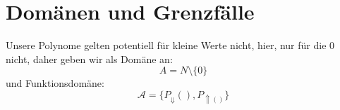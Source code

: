 \documentclass{article}
\begin{document}
	\section{Dom\"anen und Grenzf\"alle}
	Unsere Polynome gelten potentiell f\"ur kleine Werte nicht, hier, nur f\"ur die 0 nicht, daher geben wir als Dom\"ane an:
	\[ A = N\setminus\{0\} \]
und Funktionsdom\"ane:\\
	\[\mathcal{A} = \{P_{\Downarrow}(),P_{\Uparrow()}\}\]
	
	
	
	
	
	
	
	
	
	
	
	
	
	
	
	
	
	
	
	
	
	
	
	
\end{document}
